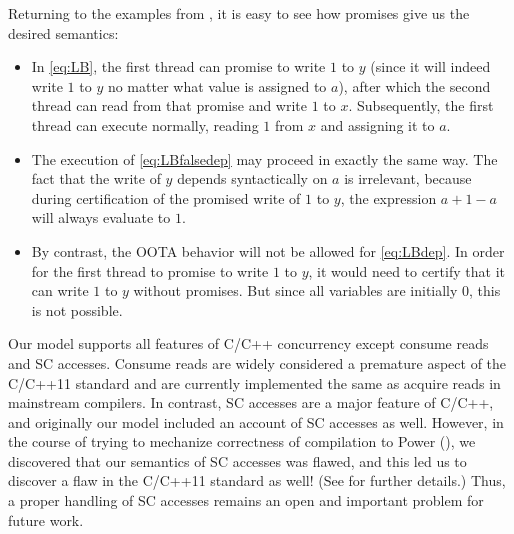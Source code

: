Returning to the examples from , it is easy to see how
promises give us the desired semantics:
\begin{itemize}
\item In \ref{eq:LB}, the first thread can promise to write $1$ to $y$ (since
  it will indeed write $1$ to $y$ no matter what value is assigned to
  $a$), after which the second thread can read from that promise and
  write $1$ to $x$.  Subsequently, the first thread can execute
  normally, reading $1$ from $x$ and assigning it to $a$.
\item The execution of \ref{eq:LBfalsedep} may proceed in exactly the same way.  The
  fact that the write of $y$ depends syntactically on $a$ is
  irrelevant, because during certification of the promised write of $1$
  to $y$, the expression $a+1-a$ will always evaluate to $1$.
\item By contrast, the OOTA behavior will not be allowed for \ref{eq:LBdep}.
  In order for the first thread to promise to write $1$ to $y$, it
  would need to certify that it can write $1$ to $y$ 
without promises.  But since all variables are
  initially $0$, this is not possible.
\end{itemize}

Our model supports all features of C/C++ concurrency except consume
reads and SC accesses.  Consume reads are widely considered a
premature aspect of the C/C++11 standard and are currently implemented
the same as acquire reads in mainstream compilers.  In contrast, SC
accesses are a major feature of C/C++, and originally our model included
an account of SC accesses as well.  However, in the course of trying
to mechanize correctness of compilation to Power
(), we discovered that our semantics of SC
accesses was flawed, and this led us to discover a flaw in the C/C++11
standard as well!  (See \cite{repairing-sc} for further details.)
Thus, a proper handling of SC accesses remains an open and important
problem for future work.



